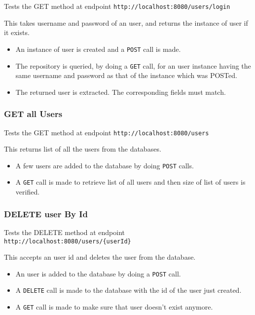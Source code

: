\documentclass[]{article}
\providecommand{\tightlist}{%
  \setlength{\itemsep}{0pt}\setlength{\parskip}{0pt}}
\begin{document}
Tests the GET method at endpoint
\texttt{http://localhost:8080/users/login}

This takes username and password of an user, and returns the instance of
user if it exists.

\begin{itemize}
\tightlist
\item
  An instance of user is created and a \texttt{POST} call is made.
\item
  The repository is queried, by doing a \texttt{GET} call, for an user
  instance having the same username and password as that of the instance
  which was POSTed.
\item
  The returned user is extracted. The corresponding fields must match.
\end{itemize}

\hypertarget{get-all-users}{%
\subsubsection{GET all Users}\label{get-all-users}}

Tests the GET method at endpoint \texttt{http://localhost:8080/users}

This returns list of all the users from the databases.

\begin{itemize}
\tightlist
\item
  A few users are added to the database by doing \texttt{POST} calls.
\item
  A \texttt{GET} call is made to retrieve list of all users and then
  size of list of users is verified.
\end{itemize}

\hypertarget{delete-user-by-id}{%
\subsubsection{DELETE user By Id}\label{delete-user-by-id}}

Tests the DELETE method at endpoint
\texttt{http://localhost:8080/users/\{userId\}}

This accepts an user id and deletes the user from the database.

\begin{itemize}
\tightlist
\item
  An user is added to the database by doing a \texttt{POST} call.
\item
  A \texttt{DELETE} call is made to the database with the id of the user
  just created.
\item
  A \texttt{GET} call is made to make sure that user doesn't exist
  anymore.
\end{itemize}
\end{document}
